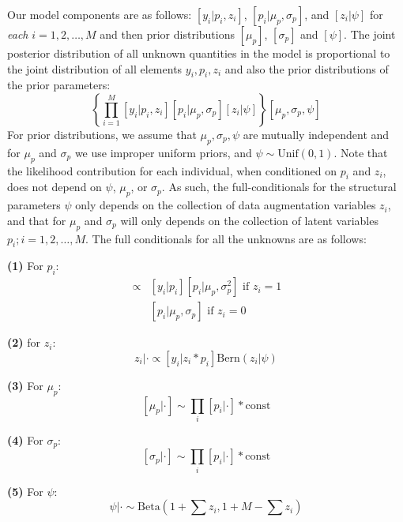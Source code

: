 Our model components are as follows: $[y_{i}| p_{i},z_{i}]$,
$[p_{i}|\mu_{p},\sigma_{p}]$, and $[z_{i}|\psi]$
for {\it each} $i=1,2,\ldots,M$ and then prior distributions
$[\mu_{p}]$, $[\sigma_{p}]$ and $[\psi]$.
The joint posterior distribution of all unknown quantities in the model
is proportional to the joint distribution of all elements
$y_{i},p_{i},z_{i}$ and also the prior distributions of the prior parameters:
\[
\left\{ \prod_{i=1}^{M} [y_{i}|p_{i},z_{i}][p_{i}|\mu_{p},\sigma_{p}]
[z_{i}|\psi] \right\} [\mu_{p},\sigma_{p},\psi]
\]
For prior distributions, we assume that $\mu_{p},\sigma_{p}, \psi$ are
mutually independent and for $\mu_{p}$ and $\sigma_{p}$ we use
improper uniform priors, and $\psi \sim \mbox{Unif}(0,1)$.  Note that
the likelihood contribution for each individual, when conditioned on
$p_{i}$ and $z_{i}$, does not depend on $\psi$, $\mu_{p}$, or
$\sigma_{p}$.  As such, the full-conditionals for the structural
parameters $\psi$ only depends on the collection of data augmentation
variables $z_{i}$, and that for $\mu_{p}$ and $\sigma_{p}$ will only
depends on the collection of latent variables $p_{i}; i=1,2,\ldots,M$.
The full conditionals for all the unknowns are as follows:

{\bf (1)} For $p_{i}$:
\begin{eqnarray*}
[p_{i}|y_{i}, \mu_p, \sigma_{p},z_{i}=1] &\propto  &
[y_{i}|p_{i}][p_{i}|\mu_p,\sigma_{p}^{2}] \mbox{ if $z_{i}=1$ }  \\
                 &  &  [p_{i}|\mu_p,\sigma_{p}] \mbox{ if $z_{i}=0$ }
\end{eqnarray*}

{\bf (2)} for $z_{i}$:
\[
z_{i} | \cdot \propto [y_{i}|z_{i}*p_{i}] \mbox{Bern}(z_{i}|\psi)
\]

{\bf (3)} For $\mu_{p}$:
\[
[\mu_{p} | \cdot ] \sim \prod_{i} [p_{i}| \cdot] *\mbox{const}
\]


{\bf (4)} For $\sigma_{p}$:
\[
[ \sigma_{p}|\cdot ] \sim\prod_{i}[p_{i}| \cdot ]*\mbox{const}
\]

{\bf (5)} For $\psi$:
\[
\psi|\cdot\sim \mbox{Beta}(1 + \sum z_{i}, 1 + M - \sum z_{i})
\]


